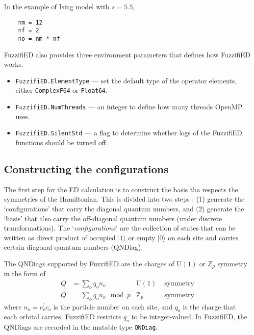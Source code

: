 \documentclass{timesjhep}
\begin{document}
In the example of Ising model with $s=5.5$,
\begin{lstlisting}
    nm = 12
    nf = 2
    no = nm * nf
\end{lstlisting}

FuzzifiED also provides three environment parameters that defines how FuzzifiED works.
\begin{itemize}
    \item \lstinline|FuzzifiED.ElementType| --- set the default type of the operator elements, either \lstinline|ComplexF64| or \lstinline|Float64|.
    \item \lstinline|FuzzifiED.NumThreads| --- an integer to define how many threads OpenMP uses.
    \item \lstinline|FuzzifiED.SilentStd| --- a flag to determine whether logs of the FuzzifiED functions should be turned off. 
\end{itemize}

\subsection{Constructing the configurations}
\label{sec:ed_confs}

The first step for the ED calculation is to construct the basis tha respects the symmetries of the Hamiltonian. This is divided into two steps : (1) generate the `configurations' that carry the diagonal quantum numbers, and (2) generate the `basis' that also carry the off-diagonal quantum numbers (under discrete transformations). The `\textit{configurations}' are the collection of states that can be written as direct product of occupied $|1\rangle$ or empty $|0\rangle$ on each site and carries certain diagonal quantum numbers (QNDiag). 

The QNDiags supported by FuzzifiED are the charges of $\mathrm{U}(1)$ or $\mathbb{Z}_p$ symmetry in the form of 
\begin{align}
    Q&=\sum_oq_on_o&\mathrm{U}(1)&\textrm{ symmetry}\nonumber\\
    Q&=\sum_oq_on_o\mod p&\mathbb{Z}_p&\textrm{ symmetry}
\end{align}
where $n_o=c^\dagger_oc_o$ is the particle number on each site, and $q_o$ is the charge that each orbital carries. FuzzifiED restricts $q_o$ to be integer-valued. In FuzzifiED, the QNDiags are recorded in the mutable type \lstinline|QNDiag|.
\end{document}

